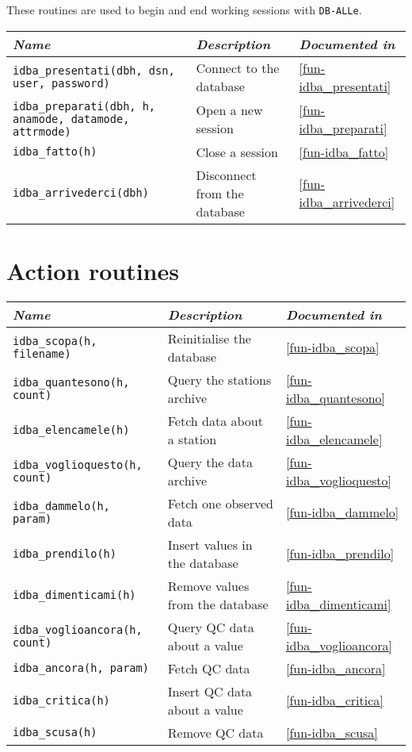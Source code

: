 \documentclass[final,12pt,a4paper,twoside]{book}
\newcommand{\dballe}{{\tt DB-ALLe}}
\begin{document}
These routines are used to begin and end working sessions with \dballe{}.

\begin{tabular}{|l|l|l|}
\hline
{\em Name} & {\em Description} & {\em Documented in} \\
\hline
{\tt idba\_presentati(dbh, dsn, user, password)} & Connect to the database & \ref{fun-idba_presentati} \\
{\tt idba\_preparati(dbh, h, anamode, datamode, attrmode)} & Open a new session & \ref{fun-idba_preparati} \\
{\tt idba\_fatto(h)}                        & Close a session              & \ref{fun-idba_fatto} \\
{\tt idba\_arrivederci(dbh)}                & Disconnect from the database & \ref{fun-idba_arrivederci} \\
\hline
\end{tabular}


\section{Action routines}

\begin{tabular}{|l|l|l|}
\hline
{\em Name} & {\em Description} & {\em Documented in} \\
\hline
{\tt idba\_scopa(h, filename)}     & Reinitialise the database       & \ref{fun-idba_scopa} \\
{\tt idba\_quantesono(h, count)}   & Query the stations archive      & \ref{fun-idba_quantesono} \\
{\tt idba\_elencamele(h)}          & Fetch data about a station      & \ref{fun-idba_elencamele} \\
{\tt idba\_voglioquesto(h, count)} & Query the data archive          & \ref{fun-idba_voglioquesto} \\
{\tt idba\_dammelo(h, param)}      & Fetch one observed data         & \ref{fun-idba_dammelo} \\
{\tt idba\_prendilo(h)}            & Insert values in the database   & \ref{fun-idba_prendilo} \\
{\tt idba\_dimenticami(h)}         & Remove values from the database & \ref{fun-idba_dimenticami} \\
{\tt idba\_voglioancora(h, count)} & Query QC data about a value     & \ref{fun-idba_voglioancora} \\
{\tt idba\_ancora(h, param)}       & Fetch QC data                   & \ref{fun-idba_ancora} \\
{\tt idba\_critica(h)}             & Insert QC data about a value    & \ref{fun-idba_critica} \\
{\tt idba\_scusa(h)}               & Remove QC data                  & \ref{fun-idba_scusa} \\
\hline
\end{tabular}
\end{document}
